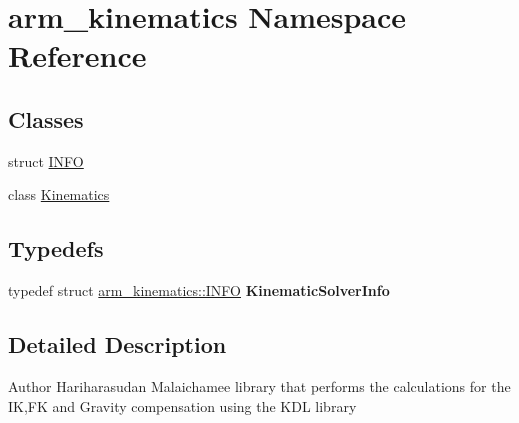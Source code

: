 \hypertarget{namespacearm__kinematics}{\section{arm\-\_\-kinematics Namespace Reference}
\label{namespacearm__kinematics}
}
\subsection*{Classes}
\begin{DoxyCompactItemize}
\item 
struct \hyperlink{structarm__kinematics_1_1_i_n_f_o}{I\-N\-F\-O}
\item 
class \hyperlink{classarm__kinematics_1_1_kinematics}{Kinematics}
\end{DoxyCompactItemize}
\subsection*{Typedefs}
\begin{DoxyCompactItemize}
\item 
\hypertarget{namespacearm__kinematics_a860a64ecab468466025e0e0b4e169080}{typedef struct \hyperlink{structarm__kinematics_1_1_i_n_f_o}{arm\-\_\-kinematics\-::\-I\-N\-F\-O} {\bfseries Kinematic\-Solver\-Info}}\label{namespacearm__kinematics_a860a64ecab468466025e0e0b4e169080}

\end{DoxyCompactItemize}


\subsection{Detailed Description}
\begin{DoxyAuthor}{Author}
Hariharasudan Malaichamee  library that performs the calculations for the I\-K,F\-K and Gravity compensation using the K\-D\-L library 
\end{DoxyAuthor}
